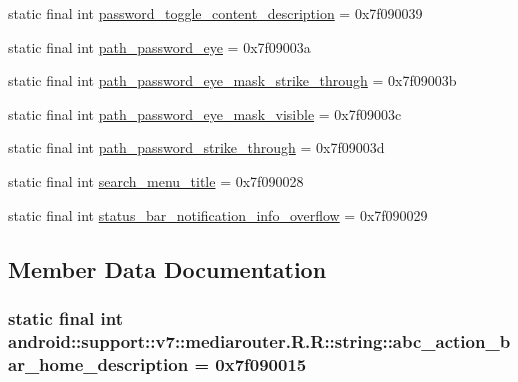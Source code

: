 \begin{CompactItemize}
\item 
static final int \hyperlink{classandroid_1_1support_1_1v7_1_1mediarouter_1_1_r_1_1string_61739bbb559c52f439e332882ffff805}{password\_\-toggle\_\-content\_\-description} = 0x7f090039
\item 
static final int \hyperlink{classandroid_1_1support_1_1v7_1_1mediarouter_1_1_r_1_1string_f55efaf55054fb9ab016ef6efa52c22b}{path\_\-password\_\-eye} = 0x7f09003a
\item 
static final int \hyperlink{classandroid_1_1support_1_1v7_1_1mediarouter_1_1_r_1_1string_df57bff7f93b317b597ce01ddf639fe9}{path\_\-password\_\-eye\_\-mask\_\-strike\_\-through} = 0x7f09003b
\item 
static final int \hyperlink{classandroid_1_1support_1_1v7_1_1mediarouter_1_1_r_1_1string_4a1abe6bb4b9a8ef26a418ea35342c69}{path\_\-password\_\-eye\_\-mask\_\-visible} = 0x7f09003c
\item 
static final int \hyperlink{classandroid_1_1support_1_1v7_1_1mediarouter_1_1_r_1_1string_cabb30d1b7e2b92ac3654778b86460d7}{path\_\-password\_\-strike\_\-through} = 0x7f09003d
\item 
static final int \hyperlink{classandroid_1_1support_1_1v7_1_1mediarouter_1_1_r_1_1string_6a39d9b45aae94ff637c348efc5c7e37}{search\_\-menu\_\-title} = 0x7f090028
\item 
static final int \hyperlink{classandroid_1_1support_1_1v7_1_1mediarouter_1_1_r_1_1string_a766a9c63fc6630aaec74b553e59284f}{status\_\-bar\_\-notification\_\-info\_\-overflow} = 0x7f090029
\end{CompactItemize}


\subsection{Member Data Documentation}
\hypertarget{classandroid_1_1support_1_1v7_1_1mediarouter_1_1_r_1_1string_d3b92126d595e8c148d8d2b38dadee92}{
\subsubsection[{abc\_\-action\_\-bar\_\-home\_\-description}]{\setlength{\rightskip}{0pt plus 5cm}static final int android::support::v7::mediarouter.R.R::string::abc\_\-action\_\-bar\_\-home\_\-description = 0x7f090015}}
\label{classandroid_1_1support_1_1v7_1_1mediarouter_1_1_r_1_1string_d3b92126d595e8c148d8d2b38dadee92}


